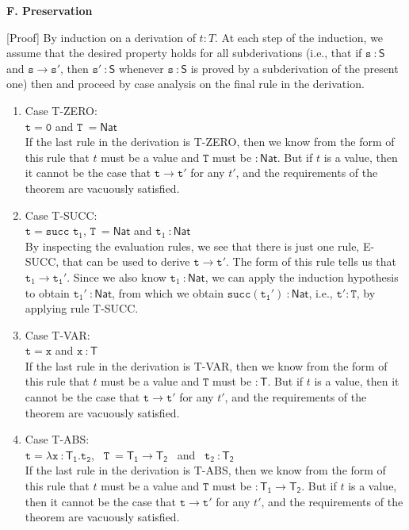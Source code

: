 \documentclass[a4paper]{article}
\begin{document}
\textbf{F. Preservation}

{[Proof]} By induction on a derivation of $t:T$. At each step of the induction, we assume that the desired property holds for all subderivations (i.e., that if $\mathtt s ~\mathsf {: S}$ and $\mathtt s \rightarrow \mathtt s'$, then $\mathtt s' ~\mathsf {: S}$ whenever $\mathtt s ~\mathsf {: S}$ is proved by a subderivation of the present one) then  and proceed by case analysis on the final rule in the derivation.
\begin{enumerate}
\item Case T-ZERO:\\
$\mathtt {t = 0}$ and $\mathtt T~\mathsf {= Nat}$\\
If the last rule in the derivation is T-ZERO, then we know from the form of this rule that $t$ must be a value and $\mathtt T$ must be $\mathsf { : Nat}$. But if $t$ is a value, then it cannot be the case that $\mathtt t \rightarrow \mathtt{t'}$ for any $t'$, and the requirements of the theorem are vacuously satisfied.
\item Case T-SUCC:\\
$\mathtt {t = succ}$ $\mathtt t_1$, $\mathtt T~\mathsf {= Nat}$ and $\mathtt t_1 ~\mathsf {: Nat}$\\
By inspecting the evaluation rules, we see that there is just one rule, E-SUCC, that can be used to derive $\mathtt t \rightarrow \mathtt{t'}$. The form of this rule tells us that $\mathtt t_1 \rightarrow \mathtt{t_1'}$. Since we also know $\mathtt t_1 ~\mathsf {: Nat}$, we can apply the induction hypothesis to obtain $\mathtt t_1' ~\mathsf {: Nat}$, from which we obtain $\mathtt {succ(t_1')} ~\mathsf {: Nat}$, i.e., $\mathtt{t'} : \mathtt T$, by applying rule T-SUCC.
\item Case T-VAR:\\
$\mathtt {t = x}$ and $\mathtt x~\mathsf {:T}$\\
If the last rule in the derivation is T-VAR, then we know from the form of this rule that $t$ must be a value and $\mathtt T$ must be $\mathsf { :T}$. But if $t$ is a value, then it cannot be the case that $\mathtt t \rightarrow \mathtt{t'}$ for any $t'$, and the requirements of the theorem are vacuously satisfied.
\item Case T-ABS:\\
$\mathtt {t = \lambda x}~\mathsf{:T_1}\mathtt {.t_2}$, \ $\mathtt T~\mathsf {= T_1 \rightarrow T_2}$ \ and \ $\mathtt t_2 ~\mathsf {: T_2}$\\
If the last rule in the derivation is T-ABS, then we know from the form of this rule that $t$ must be a value and $\mathtt T$ must be $\mathsf { :T_1 \rightarrow T_2}$. But if $t$ is a value, then it cannot be the case that $\mathtt t \rightarrow \mathtt{t'}$ for any $t'$, and the requirements of the theorem are vacuously satisfied.

\end{enumerate}
\end{document}
